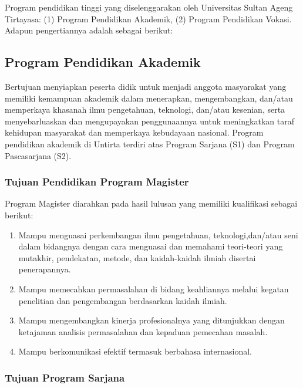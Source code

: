 \documentclass[
]{book}
\providecommand{\tightlist}{%
  \setlength{\itemsep}{0pt}\setlength{\parskip}{0pt}}
\begin{document}
Program pendidikan tinggi yang diselenggarakan oleh Universitas Sultan Ageng Tirtayasa: (1) Program Pendidikan Akademik, (2) Program Pendidikan Vokasi. Adapun pengertiannya adalah sebagai berikut:

\hypertarget{program-pendidikan-akademik}{%
\subsection{Program Pendidikan Akademik}\label{program-pendidikan-akademik}}

Bertujuan menyiapkan peserta didik untuk menjadi anggota masyarakat yang memiliki kemampuan akademik dalam menerapkan, mengembangkan, dan/atau memperkaya khasanah ilmu pengetahuan, teknologi, dan/atau kesenian, serta menyebarluaskan dan mengupayakan penggunaannya untuk meningkatkan taraf kehidupan masyarakat dan memperkaya kebudayaan nasional. Program pendidikan akademik di Untirta terdiri atas Program Sarjana (S1) dan Program Pascasarjana (S2).

\hypertarget{tujuan-pendidikan-program-magister}{%
\subsubsection{Tujuan Pendidikan Program Magister}\label{tujuan-pendidikan-program-magister}}

Program Magister diarahkan pada hasil lulusan yang memiliki kualifikasi sebagai berikut:

\begin{enumerate}
\def\labelenumi{\arabic{enumi}.}
\tightlist
\item
  Mampu menguasai perkembangan ilmu pengetahuan, teknologi,dan/atau seni dalam bidangnya dengan cara menguasai dan memahami teori-teori yang mutakhir, pendekatan, metode, dan kaidah-kaidah ilmiah disertai penerapannya.
\item
  Mampu memecahkan permasalahan di bidang keahliannya melalui kegatan penelitian dan pengembangan berdasarkan kaidah ilmiah.
\item
  Mampu mengembangkan kinerja profesionalnya yang ditunjukkan dengan ketajaman analisis permasalahan dan kepaduan pemecahan masalah.
\item
  Mampu berkomunikasi efektif termasuk berbahasa internasional.
\end{enumerate}

\hypertarget{tujuan-program-sarjana}{%
\subsubsection{Tujuan Program Sarjana}\label{tujuan-program-sarjana}}
\end{document}
